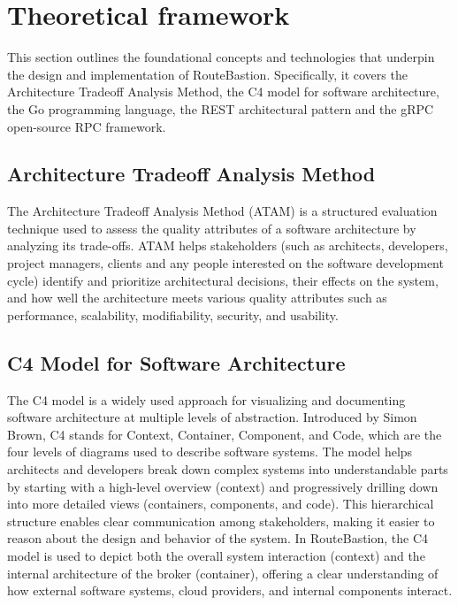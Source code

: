 

\section{Theoretical framework}
\label{sec:theoretical_framework}

This section outlines the foundational concepts and technologies that underpin the design and implementation of RouteBastion. Specifically, it covers the Architecture Tradeoff Analysis Method, the C4 model for software architecture, the Go programming language, the REST architectural pattern and the gRPC open-source RPC framework.

\subsection{Architecture Tradeoff Analysis Method}
\label{subsec:atam}

The Architecture Tradeoff Analysis Method (ATAM) \cite{atam} is a structured evaluation technique used to assess the quality attributes of a software architecture by analyzing its trade-offs. ATAM helps stakeholders (such as architects, developers, project managers, clients and any people interested on the software development cycle) identify and prioritize architectural decisions, their effects on the system, and how well the architecture meets various quality attributes such as performance, scalability, modifiability, security, and usability.

\subsection{C4 Model for Software Architecture}
\label{subsec:c4_model_for_software_architecture}
The C4 model \cite{c4model} is a widely used approach for visualizing and documenting software architecture at multiple levels of abstraction. Introduced by Simon Brown, C4 stands for Context, Container, Component, and Code, which are the four levels of diagrams used to describe software systems. The model helps architects and developers break down complex systems into understandable parts by starting with a high-level overview (context) and progressively drilling down into more detailed views (containers, components, and code). This hierarchical structure enables clear communication among stakeholders, making it easier to reason about the design and behavior of the system. In RouteBastion, the C4 model is used to depict both the overall system interaction (context) and the internal architecture of the broker (container), offering a clear understanding of how external software systems, cloud providers, and internal components interact.


